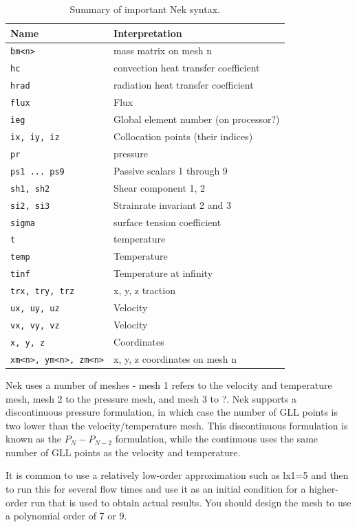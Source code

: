 \documentclass[10pt]{article}
\numberwithin{equation}{section} %
\begin{document}
\begin{itemize}
\begin{table}[H]
\caption{Summary of important Nek syntax.}
\centering
\begin{tabular}{p{5cm}p{10cm}}
\hline\hline
Name & Interpretation \\ [0.5ex]
\hline
{\tt bm<n>} & mass matrix on mesh n\\
{\tt hc} & convection heat transfer coefficient\\
{\tt hrad} & radiation heat transfer coefficient\\
{\tt flux} & Flux\\
{\tt ieg} & Global element number (on processor?)\\
{\tt ix, iy, iz} & Collocation points (their indices)\\
{\tt pr} & pressure\\
{\tt ps1 ... ps9} & Passive scalars 1 through 9\\
{\tt sh1, sh2} & Shear component 1, 2\\
{\tt si2, si3} & Strainrate invariant 2 and 3\\
{\tt sigma} & surface tension coefficient\\
{\tt t} & temperature\\
{\tt temp} & Temperature\\
{\tt tinf} & Temperature at infinity\\
{\tt trx, try, trz} & x, y, z traction\\
{\tt ux, uy, uz} & Velocity\\
{\tt vx, vy, vz} & Velocity\\
{\tt x, y, z} & Coordinates\\
{\tt xm<n>, ym<n>, zm<n>} & x, y, z coordinates on mesh n\\
\hline
\end{tabular}
\end{table}

Nek uses a number of meshes - mesh 1 refers to the velocity and temperature mesh, mesh 2 to the pressure mesh, and mesh 3 to ?. Nek supports a discontinuous pressure formulation, in which case the number of GLL points is two lower than the velocity/temperature mesh. This discontinuous formulation is known as the \(P_N-P_{N-2}\) formulation, while the continuous uses the same number of GLL points as the velocity and temperature.

It is common to use a relatively low-order approximation such as lx1=5 and then to run this for several flow times and use it as an initial condition for a higher-order run that is used to obtain actual results. You should design the mesh to use a polynomial order of 7 or 9.


\end{itemize}
\end{document}
